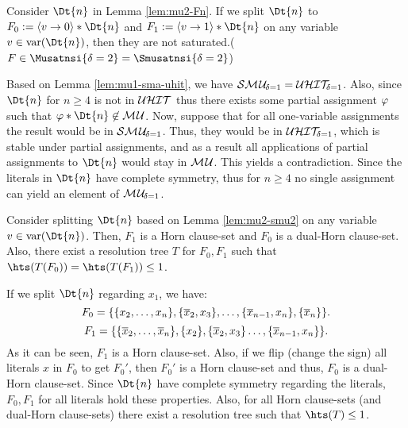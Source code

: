 \documentclass{report}
\begin{document}
\begin{lem}\label{lem:mu2-smu2}
Consider $\Dt{n}$ in Lemma \ref{lem:mu2-Fn}. If we split $\Dt{n}$ to $F_0:=\pao v0 * \Dt{n}$ and $F_1:=\pao v1 * \Dt{n}$ on any variable $v \in \var(\Dt{n})$, then they are not saturated.($F \in \Musatnsi{\delta=2} = \Smusatnsi{\delta=2}$)
\end{lem}
\begin{prf}
Based on Lemma \ref{lem:mu1-sma-uhit}, we have $\mathcal{S}\mathcal{M\hspace{0.8pt}U}_{\!\delta=1} = \mathcal{U}\mathcal{HIT}_{\!\!\delta=1}$. Also, since $\Dt{n}$ for $n \ge 4$ is not in $\mathcal{U}\mathcal{HIT}$ thus there exists some partial assignment $\varphi$ such that $\vp * \Dt{n} \not \in \Musat$. Now, suppose that for all one-variable assignments the result would be in $\mathcal{S}\mathcal{M\hspace{0.8pt}U}_{\!\delta=1}$. Thus, they would be in $\mathcal{U}\mathcal{HIT}_{\!\!\delta=1}$, which is stable under partial assignments, and as a result all applications of partial assignments to $\Dt{n}$ would stay in $\mathcal{M\hspace{0.8pt}U}$. This yields a contradiction. Since  the literals in $\Dt{n}$ have complete symmetry, thus for $n \ge 4$ no single assignment can yield an element of $\mathcal{M\hspace{0.8pt}U}_{\!\delta=1}$.
\end{prf}

\begin{lem}\label{lem:mu2-horn-tree}
Consider splitting $\Dt{n}$ based on Lemma \ref{lem:mu2-smu2} on any variable $v \in \var(\Dt{n})$. Then, $ F_1$ is a Horn clause-set and $ F_0$ is a dual-Horn clause-set. Also, there exist a resolution tree $T$ for $ F_0,F_1$ such that $\hts(T(F_0))= \hts(T(F_1)) \le 1$.
\end{lem}
\begin{prf}
If we split $\Dt{n}$ regarding $x_1$, we have:
\begin{displaymath}
F_0=\{ \{ x_2,\dots,x_n \},\{ \overline x_2,x_3 \},\dots, \{ \overline x_{n-1},x_n \},\{ \overline x_n \} \}.
\end{displaymath}
\begin{displaymath}
F_1=\{ \{ \overline x_2,\dots,\overline x_n \},\{ x_2 \},\{ \overline x_2,x_3 \}\dots, \{ \overline x_{n-1},x_n \} \}.
\end{displaymath}
As it can be seen, $F_1$ is a Horn clause-set. Also, if we flip (change the sign) all literals $x$ in  $F_0$ to get $F_0'$, then $F_0'$ is a Horn clause-set and thus, $ F_0$ is a dual-Horn clause-set. Since $\Dt{n}$ have complete symmetry regarding the literals, $F_0, F_1$ for all literals hold these properties. Also, for all Horn clause-sets (and dual-Horn clause-sets) there exist a resolution tree such that $\hts(T) \le 1$.
\end{prf}
\end{document}
